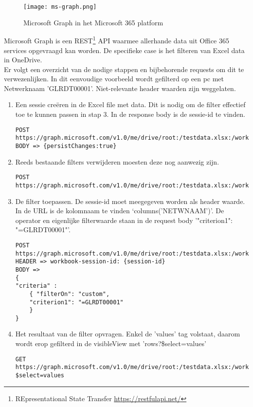 \begin{figure}[h!]
    \texttt{[image: ms-graph.png]}
    \caption{Microsoft Graph in het Microsoft 365 platform \autocite{MicrosoftDocs2020d}}
    \label{fig:ms-graph}
\end{figure}


Microsoft Graph is een REST\footnote{REpresentational State Transfer \url{https://restfulapi.net/}} API waarmee allerhande data uit Office 365 services opgevraagd kan worden. De specifieke case is het filteren van Excel data in OneDrive.\\
Er volgt een overzicht van de nodige stappen en bijbehorende requests om dit te verwezenlijken.
In dit eenvoudige voorbeeld wordt gefilterd op een pc met Netwerknaam 'GLRDT00001'. Niet-relevante header waarden zijn weggelaten.
\begin{enumerate}
    \item Een sessie creëren in de Excel file met data. Dit is nodig om de filter effectief toe te kunnen passen in stap 3. In de response body is de sessie-id te vinden.
\begin{lstlisting}
POST https://graph.microsoft.com/v1.0/me/drive/root:/testdata.xlsx:/workbook/createsession
BODY => {persistChanges:true}
\end{lstlisting}
    \item Reeds bestaande filters verwijderen moesten deze nog aanwezig zijn.
\begin{lstlisting}
POST https://graph.microsoft.com/v1.0/me/drive/root:/testdata.xlsx:/workbook/worksheets('Blad1')/tables('tabel1')/clearFilters
\end{lstlisting}
    \item De filter toepassen. De sessie-id moet meegegeven worden als header waarde. In de URL is de kolomnaam te vinden `columns('NETWNAAM')'. De operator en eigenlijke filterwaarde staan in de request body '"criterion1": "=GLRDT00001"'.
\begin{lstlisting}
POST https://graph.microsoft.com/v1.0/me/drive/root:/testdata.xlsx:/workbook/worksheets('Blad1')/tables('tabel1')/columns('NETWNAAM')/filter/apply
HEADER => workbook-session-id: {session-id}
BODY => 
{
"criteria" : 
    { "filterOn": "custom",
    "criterion1": "=GLRDT00001"
    }
}
\end{lstlisting}
    \item Het resultaat van de filter opvragen. Enkel de 'values' tag volstaat, daarom wordt erop gefilterd in de visibleView met 'rows?\$select=values'
\begin{lstlisting}
GET https://graph.microsoft.com/v1.0/me/drive/root:/testdata.xlsx:/workbook/worksheets('Blad1')/tables('tabel1')/range/visibleView/rows?$select=values
\end{lstlisting}
\end{enumerate}


